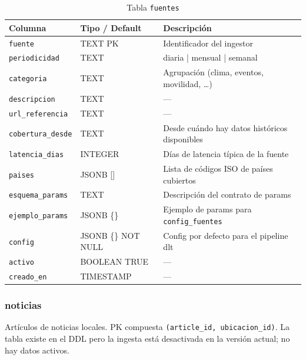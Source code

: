 \documentclass[12pt, a4paper]{article}
\begin{document}
\begin{table}[H]
\centering
\renewcommand{\arraystretch}{1.2}
\begin{tabular}{llp{5.5cm}}
\toprule
\textbf{Columna} & \textbf{Tipo / Default} & \textbf{Descripción} \\
\midrule
\texttt{fuente}           & TEXT PK        & Identificador del ingestor \\
\texttt{periodicidad}     & TEXT           & diaria | mensual | semanal \\
\texttt{categoria}        & TEXT           & Agrupación (clima, eventos, movilidad, \ldots) \\
\texttt{descripcion}      & TEXT           & — \\
\texttt{url\_referencia}  & TEXT           & — \\
\texttt{cobertura\_desde} & TEXT           & Desde cuándo hay datos históricos disponibles \\
\texttt{latencia\_dias}   & INTEGER        & Días de latencia típica de la fuente \\
\texttt{paises}           & JSONB []       & Lista de códigos ISO de países cubiertos \\
\texttt{esquema\_params}  & TEXT           & Descripción del contrato de params \\
\texttt{ejemplo\_params}  & JSONB \{\}    & Ejemplo de params para \texttt{config\_fuentes} \\
\texttt{config}           & JSONB \{\} NOT NULL & Config por defecto para el pipeline dlt \\
\texttt{activo}           & BOOLEAN TRUE   & — \\
\texttt{creado\_en}       & TIMESTAMP      & — \\
\bottomrule
\end{tabular}
\caption{Tabla \texttt{fuentes}}
\end{table}

\subsubsection{noticias}

Artículos de noticias locales. PK compuesta \texttt{(article\_id, ubicacion\_id)}. La tabla existe en el DDL pero la ingesta está desactivada en la versión actual; no hay datos activos.
\end{document}
